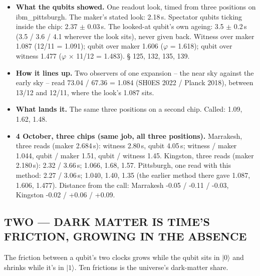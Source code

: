 \documentclass[11pt]{article}
\begin{document}
\begin{itemize}
\item \textbf{What the qubits showed.} One readout look, timed from three positions on ibm\_pittsburgh. The maker's stated look: 2.18\,\textmu s. Spectator qubits ticking inside the chip: 2.37 \(\pm\) 0.03\,\textmu s. The looked-at qubit's own ageing: 3.5 \(\pm\) 0.2\,\textmu s (3.5 / 3.6 / 4.1 wherever the look sits), never given back. Witness over maker 1.087 (12/11 = 1.091); qubit over maker 1.606 (\(\varphi\) = 1.618); qubit over witness 1.477 (\(\varphi\) \(\times\) 11/12 = 1.483). \S{} 125, 132, 135, 139.
\item \textbf{How it lines up.} Two observers of one expansion -- the near sky against the early sky -- read 73.04 / 67.36 = 1.084 (SH0ES 2022 / Planck 2018), between 13/12 and 12/11, where the look's 1.087 sits.
\item \textbf{What lands it.} The same three positions on a second chip. Called: 1.09, 1.62, 1.48.
\item \textbf{4 October, three chips (same job, all three positions).} Marrakesh, three reads (maker 2.684\,\textmu s): witness 2.80\,\textmu s, qubit 4.05\,\textmu s; witness / maker 1.044, qubit / maker 1.51, qubit / witness 1.45. Kingston, three reads (maker 2.180\,\textmu s): 2.32 / 3.66\,\textmu s; 1.066, 1.68, 1.57. Pittsburgh, one read with this method: 2.27 / 3.06\,\textmu s; 1.040, 1.40, 1.35 (the earlier method there gave 1.087, 1.606, 1.477). Distance from the call: Marrakesh -0.05 / -0.11 / -0.03, Kingston -0.02 / +0.06 / +0.09.
\end{itemize}
\subsection{TWO --- DARK MATTER IS TIME'S FRICTION, GROWING IN THE ABSENCE}
The friction between a qubit's two clocks grows while the qubit sits in \(|0\rangle\) and shrinks while it's in \(|1\rangle\). Ten frictions is the universe's dark-matter share.
\end{document}
